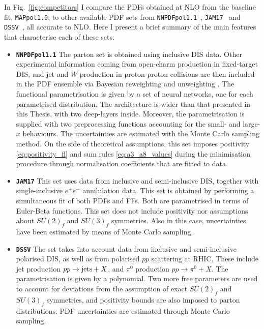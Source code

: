 In Fig.~\ref{fig:competitors} I compare the PDFs obtained at NLO from the baseline fit, \texttt{MAPpol1.0}, to other available PDF sets from \texttt{NNPDFpol1.1}~\cite{Nocera:2014gqa}, \texttt{JAM17}~\cite{Ethier:2017zbq} and \texttt{DSSV}~\cite{DeFlorian:2019xxt}, all accurate to NLO. Here I present a brief summary of the main features that characterise each of these sets:
\begin{itemize}
  \item[] \texttt{\textbf{NNPDFpol1.1}} The parton set is obtained using inclusive DIS data. Other experimental information coming from open-charm production in fixed-target DIS, and jet and $W$ production in proton-proton collisions are then included in the PDF ensemble via Bayesian reweighting and unweighting \cite{Ball:2011gg, Ball:2010gb}. The functional parametrisation is given by a set of neural networks, one for each parametrised distribution. The architecture is wider than that presented in this Thesis, with two deep-layers inside. Moreover, the parametrisation is supplied with two preprocessing functions accounting for the small- and large-$x$ behaviours. The uncertainties are estimated with the Monte Carlo sampling method. On the side of theoretical assumptions, this set imposes positivity \eqref{eq:positivity_fl} and sum rules \eqref{eq:a3_a8_values} during the minimisation procedure through normalisation coefficients that are fitted to data. 
  \item[] \texttt{\textbf{JAM17}} This set uses data from inclusive and semi-inclusive DIS, together with single-inclusive $e^+ e^-$ annihilation data. This set is obtained by performing a simultaneous fit of both PDFs and FFs. Both are parametrised in terms of Euler-Beta functions. This set does not include positivity nor assumptions about $SU(2)_f$ and $SU(3)_f$ symmetries. Also in this case, uncertainties have been estimated by means of Monte Carlo sampling.
  \item[] \texttt{\textbf{DSSV}} The set takes into account data from inclusive and semi-inclusive polarised DIS, as well as from polarised $pp$ scattering at RHIC. These include jet production $pp \rightarrow \textrm{jets} + X$, and $\pi^0$ production $pp \rightarrow \pi^0 + X$. The parametrisation is given by a polynomial. Two more free parameters are used to account for deviations from the assumption of exact $SU(2)_f$ and $SU(3)_f$ symmetries, and positivity bounds are also imposed to parton distributions. PDF uncertainties are estimated through Monte Carlo sampling.
\end{itemize}

